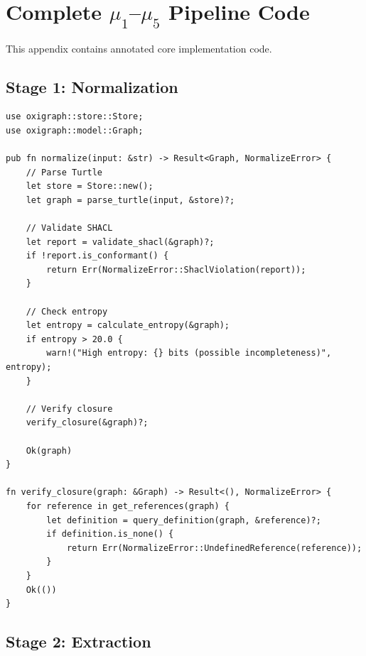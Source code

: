 \chapter{Complete \(\mu_1\)--\(\mu_5\) Pipeline Code}

This appendix contains annotated core implementation code.

\section{Stage 1: Normalization}

\begin{verbatim}
use oxigraph::store::Store;
use oxigraph::model::Graph;

pub fn normalize(input: &str) -> Result<Graph, NormalizeError> {
    // Parse Turtle
    let store = Store::new();
    let graph = parse_turtle(input, &store)?;

    // Validate SHACL
    let report = validate_shacl(&graph)?;
    if !report.is_conformant() {
        return Err(NormalizeError::ShaclViolation(report));
    }

    // Check entropy
    let entropy = calculate_entropy(&graph);
    if entropy > 20.0 {
        warn!("High entropy: {} bits (possible incompleteness)", entropy);
    }

    // Verify closure
    verify_closure(&graph)?;

    Ok(graph)
}

fn verify_closure(graph: &Graph) -> Result<(), NormalizeError> {
    for reference in get_references(graph) {
        let definition = query_definition(graph, &reference)?;
        if definition.is_none() {
            return Err(NormalizeError::UndefinedReference(reference));
        }
    }
    Ok(())
}
\end{verbatim}

\section{Stage 2: Extraction}

